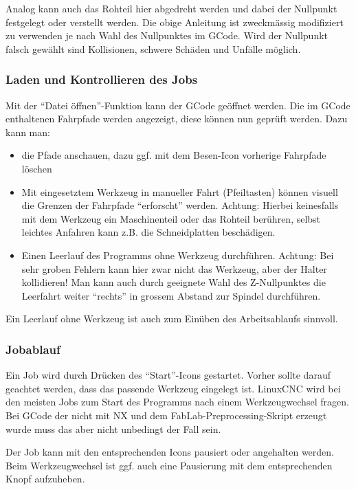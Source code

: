 \documentclass{\basedir/fablab-document}
\begin{document}

Analog kann auch das Rohteil hier abgedreht werden und dabei der Nullpunkt festgelegt oder verstellt werden. Die obige Anleitung ist zweckmässig modifiziert zu verwenden je nach Wahl des Nullpunktes im GCode. Wird der Nullpunkt falsch gewählt sind Kollisionen, schwere Schäden und Unfälle möglich.

\subsubsection{Laden und Kontrollieren des Jobs}

Mit der \enquote{Datei öffnen}-Funktion kann der GCode geöffnet werden. Die im GCode enthaltenen Fahrpfade werden angezeigt, diese können nun geprüft werden. Dazu kann man:
\begin{itemize}
	\item die Pfade anschauen, dazu ggf. mit dem Besen-Icon vorherige Fahrpfade löschen
	\item Mit eingesetztem Werkzeug in manueller Fahrt (Pfeiltasten) können visuell die Grenzen der Fahrpfade \enquote{erforscht} werden. Achtung: Hierbei keinesfalls mit dem Werkzeug ein Maschinenteil oder das Rohteil berühren, selbst leichtes Anfahren kann z.B. die Schneidplatten beschädigen.
	\item Einen Leerlauf des Programms ohne Werkzeug durchführen. Achtung: Bei sehr groben Fehlern kann hier zwar nicht das Werkzeug, aber der Halter kollidieren! Man kann auch durch geeignete Wahl des Z-Nullpunktes die Leerfahrt weiter \enquote{rechts} in grossem Abstand zur Spindel durchführen.
\end{itemize}

Ein Leerlauf ohne Werkzeug ist auch zum Einüben des Arbeitsablaufs sinnvoll.

\subsubsection{Jobablauf}

Ein Job wird durch Drücken des \enquote{Start}-Icons gestartet. Vorher sollte darauf geachtet werden,
dass das passende Werkzeug eingelegt ist. LinuxCNC wird bei den meisten Jobs zum Start des Programms nach einem Werkzeugwechsel fragen. Bei GCode der nicht mit NX und dem FabLab-Preprocessing-Skript erzeugt wurde muss das aber nicht unbedingt der Fall sein.

Der Job kann mit den entsprechenden Icons pausiert oder angehalten werden. Beim Werkzeugwechsel ist ggf. auch eine Pausierung mit dem entsprechenden Knopf aufzuheben.
\end{document}
